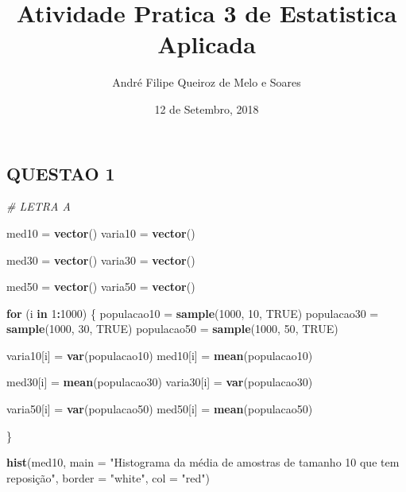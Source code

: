 \documentclass[]{article}
\title{Atividade Pratica 3 de Estatistica Aplicada}
\author{André Filipe Queiroz de Melo e Soares}
\date{12 de Setembro, 2018}
\newenvironment{Shaded}{\begin{snugshade}}{\end{snugshade}}
\newcommand{\KeywordTok}[1]{\textcolor[rgb]{0.13,0.29,0.53}{\textbf{#1}}}
\newcommand{\DataTypeTok}[1]{\textcolor[rgb]{0.13,0.29,0.53}{#1}}
\newcommand{\DecValTok}[1]{\textcolor[rgb]{0.00,0.00,0.81}{#1}}
\newcommand{\StringTok}[1]{\textcolor[rgb]{0.31,0.60,0.02}{#1}}
\newcommand{\CommentTok}[1]{\textcolor[rgb]{0.56,0.35,0.01}{\textit{#1}}}
\newcommand{\OtherTok}[1]{\textcolor[rgb]{0.56,0.35,0.01}{#1}}
\newcommand{\ControlFlowTok}[1]{\textcolor[rgb]{0.13,0.29,0.53}{\textbf{#1}}}
\newcommand{\OperatorTok}[1]{\textcolor[rgb]{0.81,0.36,0.00}{\textbf{#1}}}
\newcommand{\NormalTok}[1]{#1}
\begin{document}
\maketitle

\subsection{QUESTAO 1}\label{questao-1}

\begin{Shaded}
\begin{Highlighting}[]
\CommentTok{# LETRA A }


\NormalTok{med10 =}\StringTok{ }\KeywordTok{vector}\NormalTok{()}
\NormalTok{varia10 =}\StringTok{ }\KeywordTok{vector}\NormalTok{()}

\NormalTok{med30 =}\StringTok{ }\KeywordTok{vector}\NormalTok{()}
\NormalTok{varia30 =}\StringTok{ }\KeywordTok{vector}\NormalTok{()}

\NormalTok{med50 =}\StringTok{ }\KeywordTok{vector}\NormalTok{()}
\NormalTok{varia50 =}\StringTok{ }\KeywordTok{vector}\NormalTok{()}

\ControlFlowTok{for}\NormalTok{ (i }\ControlFlowTok{in} \DecValTok{1}\OperatorTok{:}\DecValTok{1000}\NormalTok{) \{}
\NormalTok{  populacao10 =}\StringTok{ }\KeywordTok{sample}\NormalTok{(}\DecValTok{1000}\NormalTok{, }\DecValTok{10}\NormalTok{, }\OtherTok{TRUE}\NormalTok{)}
\NormalTok{  populacao30 =}\StringTok{ }\KeywordTok{sample}\NormalTok{(}\DecValTok{1000}\NormalTok{, }\DecValTok{30}\NormalTok{, }\OtherTok{TRUE}\NormalTok{)}
\NormalTok{  populacao50 =}\StringTok{ }\KeywordTok{sample}\NormalTok{(}\DecValTok{1000}\NormalTok{, }\DecValTok{50}\NormalTok{, }\OtherTok{TRUE}\NormalTok{)}
  
\NormalTok{  varia10[i] =}\StringTok{ }\KeywordTok{var}\NormalTok{(populacao10)}
\NormalTok{  med10[i] =}\StringTok{ }\KeywordTok{mean}\NormalTok{(populacao10)}
  
\NormalTok{  med30[i] =}\StringTok{ }\KeywordTok{mean}\NormalTok{(populacao30)}
\NormalTok{  varia30[i] =}\StringTok{ }\KeywordTok{var}\NormalTok{(populacao30)}
  
\NormalTok{  varia50[i] =}\StringTok{ }\KeywordTok{var}\NormalTok{(populacao50)}
\NormalTok{  med50[i] =}\StringTok{ }\KeywordTok{mean}\NormalTok{(populacao50)}
  
\NormalTok{\}}


\KeywordTok{hist}\NormalTok{(med10, }\DataTypeTok{main =} \StringTok{"Histograma da média de amostras de tamanho 10 que tem reposição"}\NormalTok{, }\DataTypeTok{border =} \StringTok{"white"}\NormalTok{, }\DataTypeTok{col =} \StringTok{"red"}\NormalTok{)}
\end{Highlighting}
\end{Shaded}
\end{document}
